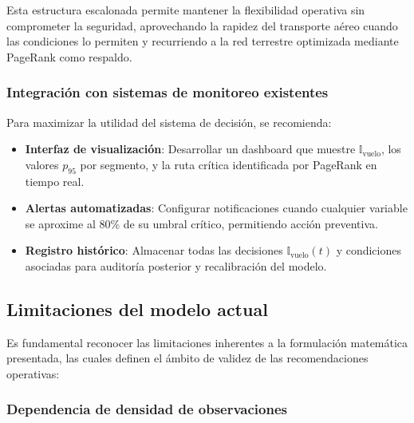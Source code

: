 \documentclass[
  spanish,
  us-letterpaper,
]{scrreprt}
\providecommand{\tightlist}{%
  \setlength{\itemsep}{0pt}\setlength{\parskip}{0pt}}
\numberwithin{equation}{section}
\begin{document}
Esta estructura escalonada permite mantener la flexibilidad operativa
sin comprometer la seguridad, aprovechando la rapidez del transporte
aéreo cuando las condiciones lo permiten y recurriendo a la red
terrestre optimizada mediante PageRank como respaldo.

\subsubsection*{Integración con sistemas de monitoreo
existentes}\label{integraciuxf3n-con-sistemas-de-monitoreo-existentes}

Para maximizar la utilidad del sistema de decisión, se recomienda:

\begin{itemize}
\tightlist
\item
  \textbf{Interfaz de visualización}: Desarrollar un dashboard que
  muestre \(\mathbb{I}_{\text{vuelo}}\), los valores \(p_{95}\) por
  segmento, y la ruta crítica identificada por PageRank en tiempo real.
\item
  \textbf{Alertas automatizadas}: Configurar notificaciones cuando
  cualquier variable se aproxime al 80\% de su umbral crítico,
  permitiendo acción preventiva.
\item
  \textbf{Registro histórico}: Almacenar todas las decisiones
  \(\mathbb{I}_{\text{vuelo}}(t)\) y condiciones asociadas para
  auditoría posterior y recalibración del modelo.
\end{itemize}

\subsection*{Limitaciones del modelo
actual}\label{limitaciones-del-modelo-actual}

Es fundamental reconocer las limitaciones inherentes a la formulación
matemática presentada, las cuales definen el ámbito de validez de las
recomendaciones operativas:

\subsubsection*{Dependencia de densidad de
observaciones}\label{dependencia-de-densidad-de-observaciones}
\end{document}
